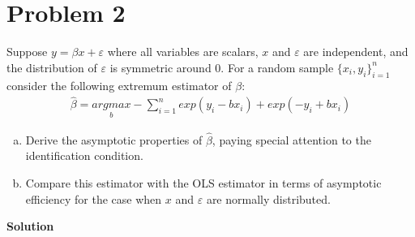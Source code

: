\documentclass[a4paper]{article}
\begin{document}
\section*{Problem 2}
Suppose $y = \beta x + \varepsilon$ where all variables are scalars, $x$ and $\varepsilon$ are independent,
and the distribution of $\varepsilon$ is symmetric around $0$. For a random sample $\{x_i,y_i\}^n_{i=1}$ consider the
following extremum estimator of $\beta$:
\begin{align*}
\hat{\beta} = \underset{b}{argmax} -\sum_{i=1}^n exp(y_i-bx_i) + exp(-y_i + bx_i)
\end{align*}
\begin{enumerate}[a)]
\item Derive the asymptotic properties of $\hat{\beta}$, paying special attention to the identification
condition.
\item Compare this estimator with the OLS estimator in terms of asymptotic efficiency for the
case when $x$ and $\varepsilon$ are normally distributed.
\end{enumerate}



\textbf{Solution}
\end{document}

